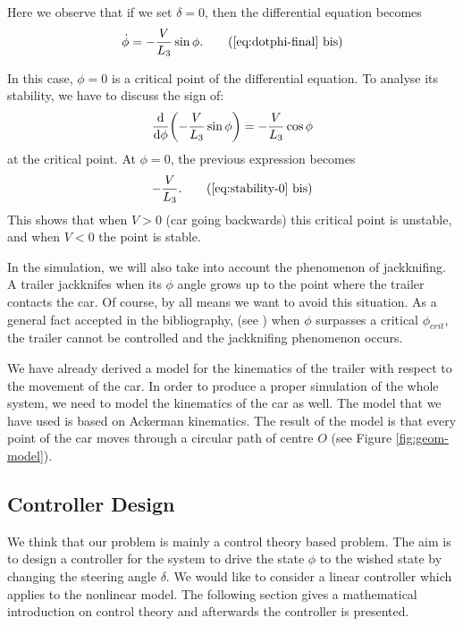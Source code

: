 Here we observe that if we set $\delta = 0$, then the differential equation becomes
\begin{align}\label{eq:dotphi-final-bis}
    \dot{\phi} = - \frac{V}{L_{3}} \sin \phi . \tag{\ref{eq:dotphi-final} bis}
\end{align}

In this case, $\phi = 0$ is a critical point of the differential equation. To analyse its stability, we have to discuss the sign of:
\begin{align}\label{eq:stability-0}
    \dv{\phi} \qty( - \frac{V}{L_{3}} \sin \phi )  = - \frac{V}{L_{3}} \cos \phi
\end{align}
at the critical point. At $\phi = 0$, the previous expression becomes
\begin{align}\label{eq:stability}
    -\frac{V}{L_3} . \tag{\ref{eq:stability-0} bis}
\end{align}
This shows that when $V > 0$ (car going backwards) this critical point is unstable, and when $V < 0$ the point is stable.

\bigskip
In the simulation, we will also take into account the phenomenon of jackknifing. A trailer jackknifes when its $\phi$
angle grows up to the point where the trailer contacts the car.
Of course, by all means we want to avoid this situation. As a general fact accepted in the bibliography, (see \cite{jack}) when $\phi$ surpasses a critical $\phi_{crit}$, the trailer cannot be controlled and the jackknifing phenomenon occurs.

\bigskip
We have already derived a model for the kinematics of the trailer with respect to the movement of the car. In order to produce a proper simulation of the whole system, we need to model the kinematics of the car as well. The model that we have used is based on Ackerman kinematics. The result of the model is that every point of the car moves through a circular path of centre $O$ (see Figure \ref{fig:geom-model}).


\subsection{Controller Design}

We think that our problem is mainly a control theory based problem. The aim is to design a controller for the system to drive the state $\phi$ to the wished state by changing the steering angle $\delta$. We would like to consider a linear controller which applies to the nonlinear model. The following section gives a mathematical introduction on control theory and afterwards the controller is presented.
